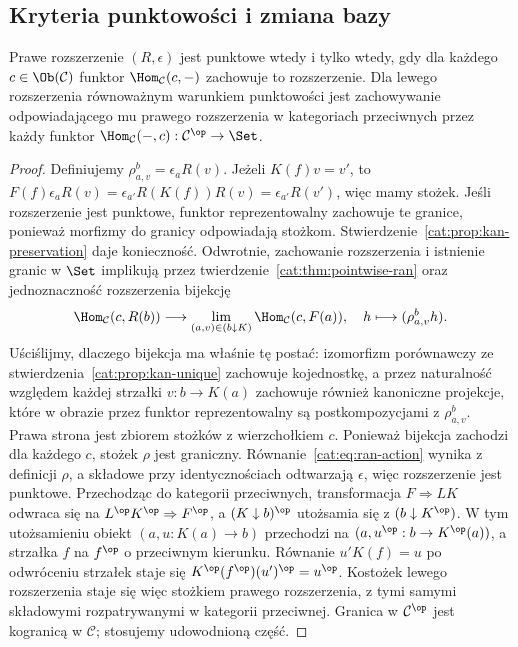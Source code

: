 \subsection{Kryteria punktowości i zmiana bazy}
\begin{stwierdzenie}\label{cat:prop:kan-pointwise-criterion}
Prawe rozszerzenie $(R,\epsilon)$ jest punktowe wtedy i tylko wtedy, gdy dla każdego $c\in\Ob(\mathcal C)$ funktor $\Hom_{\mathcal C}(c,-)$ zachowuje to rozszerzenie. Dla lewego rozszerzenia równoważnym warunkiem punktowości jest zachowywanie odpowiadającego mu prawego rozszerzenia w kategoriach przeciwnych przez każdy funktor $\Hom_{\mathcal C}(-,c):\mathcal C^{\op}\to\Set$.
\end{stwierdzenie}
\begin{proof}
Definiujemy $\rho^b_{a,v}=\epsilon_a R(v)$. Jeżeli $K(f)v=v'$, to $F(f)\epsilon_a R(v)=\epsilon_{a'}R(K(f))R(v)=\epsilon_{a'}R(v')$, więc mamy stożek. Jeśli rozszerzenie jest punktowe, funktor reprezentowalny zachowuje te granice, ponieważ morfizmy do granicy odpowiadają stożkom. Stwierdzenie~\ref{cat:prop:kan-preservation} daje konieczność. Odwrotnie, zachowanie rozszerzenia i istnienie granic w $\Set$ implikują przez twierdzenie~\ref{cat:thm:pointwise-ran} oraz jednoznaczność rozszerzenia bijekcję
\[
 \Hom_{\mathcal C}(c,R(b))
 \longrightarrow\lim_{(a,v)\in(b\downarrow K)}\Hom_{\mathcal C}(c,F(a)),
 \quad h\longmapsto(\rho^b_{a,v}h).
\]
Uściślijmy, dlaczego bijekcja ma właśnie tę postać: izomorfizm porównawczy ze stwierdzenia~\ref{cat:prop:kan-unique} zachowuje kojednostkę, a przez naturalność względem każdej strzałki $v:b\to K(a)$ zachowuje również kanoniczne projekcje, które w obrazie przez funktor reprezentowalny są postkompozycjami z $\rho^b_{a,v}$. Prawa strona jest zbiorem stożków z wierzchołkiem $c$. Ponieważ bijekcja zachodzi dla każdego $c$, stożek $\rho$ jest graniczny. Równanie~\eqref{cat:eq:ran-action} wynika z definicji $\rho$, a składowe przy identycznościach odtwarzają $\epsilon$, więc rozszerzenie jest punktowe. Przechodząc do kategorii przeciwnych, transformacja $F\Rightarrow LK$ odwraca się na $L^{\op}K^{\op}\Rightarrow F^{\op}$, a $(K\downarrow b)^{\op}$ utożsamia się z $(b\downarrow K^{\op})$. W tym utożsamieniu obiekt $(a,u:K(a)\to b)$ przechodzi na $(a,u^{\op}:b\to K^{\op}(a))$, a strzałka $f$ na $f^{\op}$ o przeciwnym kierunku. Równanie $u'K(f)=u$ po odwróceniu strzałek staje się $K^{\op}(f^{\op})(u')^{\op}=u^{\op}$. Kostożek lewego rozszerzenia staje się więc stożkiem prawego rozszerzenia, z tymi samymi składowymi rozpatrywanymi w kategorii przeciwnej. Granica w $\mathcal C^{\op}$ jest kogranicą w $\mathcal C$; stosujemy udowodnioną część.
\end{proof}
